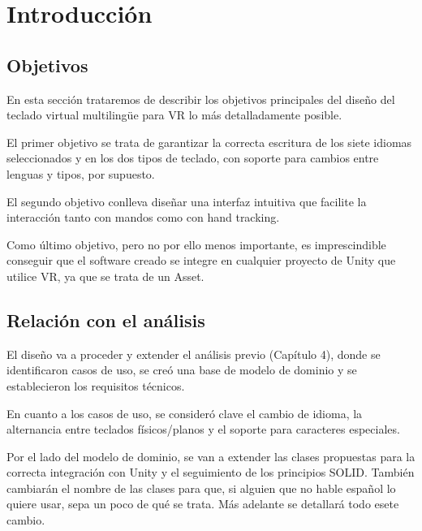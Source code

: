 

\section{Introducción}
\subsection{Objetivos}
En esta sección trataremos de describir los objetivos principales del diseño del teclado virtual multilingüe para VR lo más detalladamente posible.

El primer objetivo se trata de garantizar la correcta escritura de los siete idiomas seleccionados y en los dos tipos de teclado, con soporte para cambios entre lenguas y tipos, por supuesto.

El segundo objetivo conlleva diseñar una interfaz intuitiva que facilite la interacción tanto con mandos como con hand tracking.

Como último objetivo, pero no por ello menos importante, es imprescindible conseguir que el software creado se integre en cualquier proyecto de Unity que utilice VR, ya que se trata de un Asset. 

\subsection{Relación con el análisis}
El diseño va a proceder y extender el análisis previo (Capítulo 4), donde se identificaron casos de uso, se creó una base de modelo de dominio y se establecieron los requisitos técnicos.

En cuanto a los casos de uso, se consideró clave el cambio de idioma, la alternancia entre teclados físicos/planos y el soporte para caracteres especiales.

Por el lado del modelo de dominio, se van a extender las clases propuestas para la correcta integración con Unity y el seguimiento de los principios SOLID. También cambiarán el nombre de las clases para que, si alguien que no hable español lo quiere usar, sepa un poco de qué se trata. Más adelante se detallará todo esete cambio.

